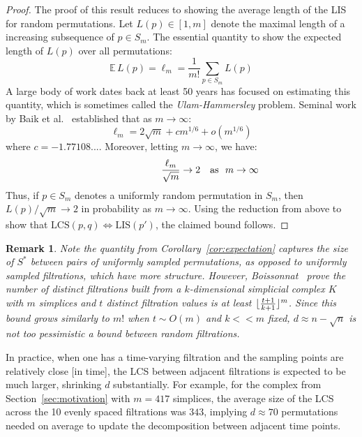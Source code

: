 \documentclass[sn-mathphys]{sn-jnl}
\newtheorem{remark}{Remark}
\DeclarePairedDelimiter\floor{\lfloor}{\rfloor}
\begin{document}
\begin{proof} \normalsize
	The proof of this result reduces to showing the average length of the LIS for random permutations. Let $L(p) \in [1,m]$ denote the maximal length of a increasing subsequence of $p \in S_m$. 
	The essential quantity to show the expected length of $L(p)$ over all permutations: 
	$$ \mathbb{E} \, L(p) = \ell_m = \frac{1}{m!} \sum\limits_{p \in S_m} L(p)$$
	A large body of work dates back at least 50 years has focused on estimating this quantity, which is sometimes called the \emph{Ulam-Hammersley} problem. Seminal work by Baik et al.~\cite{baik1999distribution} established that as $m \to \infty$:
	$$ \displaystyle \ell_m = 2 \sqrt{m} + c m^{1/6} + o(m^{1/6}) $$
where $c = -1.77108...$. Moreover, letting $m \to \infty$, we have: 
$$ \frac{\ell_m}{\sqrt{m}} \to 2\rlap{\quad \text{as } $m \to \infty$} $$	 
Thus, if $p \in S_m$ denotes a uniformly random permutation in $S_m$, then $L(p)/\sqrt{m} \to 2$ in probability as $m \to \infty$. Using the reduction from above to show that $\mathrm{LCS}(p,q) \Leftrightarrow \mathrm{LIS}(p')$, the claimed bound follows.
\end{proof}
\begin{remark}
\noindent Note the quantity from Corollary~\ref{cor:expectation} captures the size of $S^\ast$ between pairs of uniformly sampled permutations, as opposed to uniformly sampled filtrations, which have more structure. 
However, Boissonnat~\cite{boissonnat2018efficient} prove the number of distinct filtrations built from a $k$-dimensional simplicial complex $K$ with $m$ simplices and $t$ distinct filtration values is \emph{at least} $\floor{\frac{t+1}{k+1}}^m$. 
Since this bound grows similarly to $m!$ when $t \sim O(m)$ and $k << m$ fixed, $d \approx n - \sqrt{n}$ is not too pessimistic a bound between random filtrations.     
\end{remark}
\noindent 
In practice, when one has a time-varying filtration and the sampling points are relatively close [in time], the LCS between adjacent filtrations is expected to be much larger, shrinking $d$ substantially. 
For example, for the complex from Section~\ref{sec:motivation} with $m=417$ simplices, the average size of the LCS across the 10 evenly spaced filtrations was $343$, implying $d \approx 70$ permutations needed on average to update the decomposition between adjacent time points.
 
\end{document}
